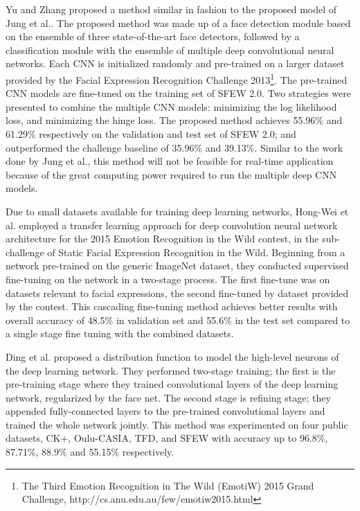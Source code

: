 \documentclass[master]{thesis-uestc}
\begin{document}
Yu and Zhang proposed a method similar in fashion to the proposed model of Jung et al.. The proposed method was made up of a face detection module based on the ensemble of three state-of-the-art face detectors, followed by a classification module with the ensemble of multiple deep convolutional neural networks. Each CNN is initialized randomly and pre-trained on a larger dataset provided by the Facial Expression Recognition Challenge 2013\footnote{The Third Emotion Recognition in The Wild (EmotiW) 2015 Grand Challenge, http://cs.anu.edu.au/few/emotiw2015.html}. The pre-trained CNN models are fine-tuned on the training set of SFEW 2.0. Two strategies were presented to combine the multiple CNN models: minimizing the log likelihood loss, and minimizing the hinge loss. The proposed method achieves 55.96\% and 61.29\% respectively on the validation and test set of SFEW 2.0; and outperformed the challenge baseline of 35.96\% and 39.13\%. Similar to the work done by Jung et al., this method will not be feasible for real-time application because of the great computing power required to run the multiple deep CNN models.

Due to small datasets available for training deep learning networks, Hong-Wei et al. employed a transfer learning approach for deep convolution neural network architecture for the 2015 Emotion Recognition in the Wild contest, in the sub-challenge of Static Facial Expression Recognition in the Wild. Beginning from a network pre-trained on the generic ImageNet dataset, they conducted supervised fine-tuning on the network in a two-stage process. The first fine-tune was on datasets relevant to facial expressions, the second fine-tuned by dataset provided by the contest. This cascading fine-tuning method achieves better results with overall accuracy of 48.5\% in validation set and 55.6\% in the test set compared to a single stage fine tuning with the combined datasets.

Ding et al. proposed a distribution function to model the high-level neurons of the deep learning network. They performed two-stage training; the first is the pre-training stage where they trained convolutional layers of the deep learning network, regularized by the face net. The second stage is refining stage; they appended fully-connected layers to the pre-trained convolutional layers and trained the whole network jointly. This method was experimented on four public datasets, CK+, Oulu-CASIA, TFD, and SFEW with accuracy up to 96.8\%, 87.71\%, 88.9\% and 55.15\% respectively.
\end{document}
